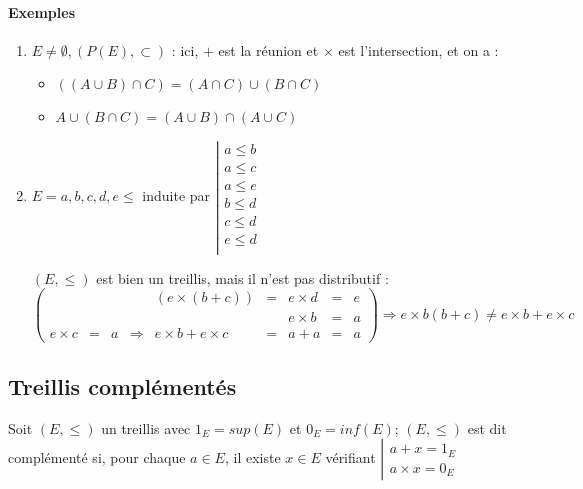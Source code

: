 \documentclass[11pt]{article}
\begin{document}
            \paragraph{Exemples}
                \begin{enumerate}
                    \item $E\neq\emptyset,(P(E),\subset)$ : ici, $+$ est la réunion et $\times$ est l'intersection, et on a :
                        \begin{itemize}
                            \item $((A\cup B)\cap C)=(A\cap C)\cup(B\cap C)$
                            \item $A\cup(B\cap C)=(A\cup B)\cap(A\cup C)$
                        \end{itemize}
                    \item $E={a,b,c,d,e}\leq$ induite par $\left|\begin{matrix}a\leq b\\
                    a\leq c\\
                    a\leq e\\
                    b\leq d\\
                    c\leq d\\
                    e\leq d\\
                    \end{matrix}\right.$

                    $(E,\leq)$ est bien un treillis, mais il n'est pas distributif :
                        $$
                        \left(
                        \begin{array}{rcrcrcrcr}
                            &&&&(e\times(b+c)) &=& e\times d &=&e\\
                            &&&&&& e\times b &=& a\\
                            e\times c &=& a &\Rightarrow& e\times b+e \times c &=&a+a &=& a
                        \end{array}
                        \right)\Rightarrow e\times b(b+c)\neq e\times b+e\times c
                        $$
                \end{enumerate}

    \subsection{Treillis complémentés}
        Soit $(E,\leq)$ un treillis avec $1_E=sup(E)$ et $0_E=inf(E)$; $(E,\leq)$ est dit complémenté si, pour chaque $a\in E$, il existe $x\in E$ vérifiant $\left|\begin{matrix}a+x=1_E\\a\times x=0_E\end{matrix}\right.$
\end{document}

